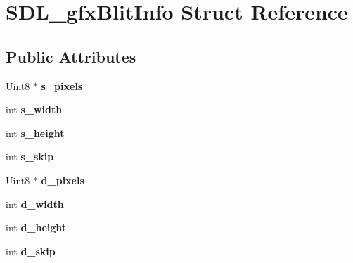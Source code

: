 \hypertarget{structSDL__gfxBlitInfo}{\section{S\+D\+L\+\_\+gfx\+Blit\+Info Struct Reference}
\label{structSDL__gfxBlitInfo}
}
\subsection*{Public Attributes}
\begin{DoxyCompactItemize}
\item 
\hypertarget{structSDL__gfxBlitInfo_afdacfb5c8054051bac7b21e3f99ee286}{Uint8 $\ast$ {\bfseries s\+\_\+pixels}}\label{structSDL__gfxBlitInfo_afdacfb5c8054051bac7b21e3f99ee286}

\item 
\hypertarget{structSDL__gfxBlitInfo_a5af7fc9d6709cccb7317122b6461f4e0}{int {\bfseries s\+\_\+width}}\label{structSDL__gfxBlitInfo_a5af7fc9d6709cccb7317122b6461f4e0}

\item 
\hypertarget{structSDL__gfxBlitInfo_a71cc45d98329f686741c9ce6e6344ece}{int {\bfseries s\+\_\+height}}\label{structSDL__gfxBlitInfo_a71cc45d98329f686741c9ce6e6344ece}

\item 
\hypertarget{structSDL__gfxBlitInfo_a1e8f74883ce15abf766f0f9c1819c9b6}{int {\bfseries s\+\_\+skip}}\label{structSDL__gfxBlitInfo_a1e8f74883ce15abf766f0f9c1819c9b6}

\item 
\hypertarget{structSDL__gfxBlitInfo_aabdef4377bb5ea77b332f9c450dfc80e}{Uint8 $\ast$ {\bfseries d\+\_\+pixels}}\label{structSDL__gfxBlitInfo_aabdef4377bb5ea77b332f9c450dfc80e}

\item 
\hypertarget{structSDL__gfxBlitInfo_a9275c2cce618daeb5094354e4dedb1fb}{int {\bfseries d\+\_\+width}}\label{structSDL__gfxBlitInfo_a9275c2cce618daeb5094354e4dedb1fb}

\item 
\hypertarget{structSDL__gfxBlitInfo_aeaf23c44c5c05d890808056c607b1c62}{int {\bfseries d\+\_\+height}}\label{structSDL__gfxBlitInfo_aeaf23c44c5c05d890808056c607b1c62}

\item 
\hypertarget{structSDL__gfxBlitInfo_a361085f02fc05608dd54c35c92b9e1f0}{int {\bfseries d\+\_\+skip}}\label{structSDL__gfxBlitInfo_a361085f02fc05608dd54c35c92b9e1f0}


\end{DoxyCompactItemize}
